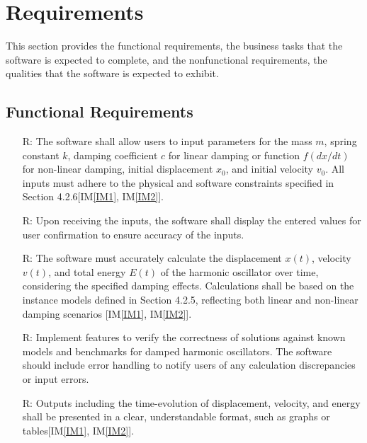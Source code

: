 \documentclass[12pt]{article}
\newcommand{\iref}[1]{IM\ref{#1}}
\newcounter{reqnum} %
\begin{document}
\section{Requirements}

This section provides the functional requirements, the business tasks that the
software is expected to complete, and the nonfunctional requirements, the
qualities that the software is expected to exhibit.

\subsection{Functional Requirements}

\noindent \begin{itemize}

\item[R\refstepcounter{reqnum}\thereqnum\label{FR1}:] The software shall 
allow users to input parameters for the mass $m$, spring constant $k$, damping 
coefficient $c$ for linear damping or function $f(dx/dt)$ for non-linear 
damping, initial displacement $x_{0}$, and initial velocity $v_{0}$. All inputs 
must adhere to the physical and software constraints specified in Section 
4.2.6[\iref{IM1}, \iref{IM2}].

\item[R\refstepcounter{reqnum}\thereqnum\label{FR2}:] Upon 
receiving the inputs, the software shall display the entered values for user 
confirmation to ensure accuracy of the inputs.

\item[R\refstepcounter{reqnum}\thereqnum\label{FR3}:] The software must 
accurately calculate the displacement $x(t)$, velocity $v(t)$, and total 
energy $E(t)$ of the harmonic oscillator over time, considering the specified 
damping effects. Calculations shall be based on the instance models defined in 
Section 4.2.5, reflecting both linear and non-linear damping scenarios 
[\iref{IM1}, \iref{IM2}].

\item[R\refstepcounter{reqnum}\thereqnum\label{FR4}:]
Implement features to verify the correctness of solutions against known models 
and benchmarks for damped harmonic oscillators. The software should include 
error handling to notify users of any calculation discrepancies or input errors.

\item[R\refstepcounter{reqnum}\thereqnum\label{FR5}:] Outputs including 
the time-evolution of displacement, velocity, and energy shall be presented 
in a clear, understandable format, such as graphs or tables[\iref{IM1}, \iref{IM2}].

\end{itemize}
\end{document}
